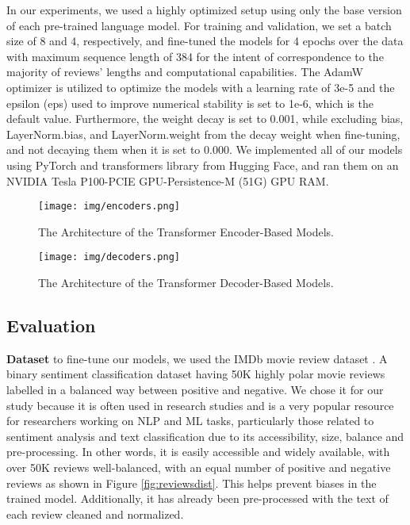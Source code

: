 \documentclass{article}
\begin{document}
In our experiments, we used a highly optimized setup using only the base version of each pre-trained language model. For training and validation, we set a batch size of 8 and 4, respectively, and fine-tuned the models for 4 epochs over the data with maximum sequence length of 384 for the intent of correspondence to the majority of reviews' lengths and computational capabilities. The AdamW optimizer is utilized to optimize the models with a learning rate of 3e-5 and the epsilon (eps) used to improve numerical stability is set to 1e-6, which is the default value. Furthermore, the weight decay is set to 0.001, while excluding bias, LayerNorm.bias, and LayerNorm.weight from the decay weight when fine-tuning, and not decaying them when it is set to 0.000. We implemented all of our models using PyTorch and transformers library from Hugging Face, and ran them on an NVIDIA Tesla P100-PCIE GPU-Persistence-M (51G) GPU RAM.


\begin{figure}[ht]
    \centering
    \texttt{[image: img/encoders.png]}
    \vspace{.5em}
    \caption{The Architecture of the Transformer Encoder-Based Models.}
    \label{fig:encoder}
\end{figure}


\begin{figure}[ht]
    \centering
    \texttt{[image: img/decoders.png]}
    \vspace{.5em}
    \caption{The Architecture of the Transformer Decoder-Based Models.}
    \label{fig:decoder}
\end{figure}




\subsection{Evaluation}
\textbf{Dataset} to fine-tune our models, we used the IMDb movie review dataset \cite{maas-EtAl:2011:ACL-HLT2011}. A binary sentiment classification dataset having 50K highly polar movie reviews labelled in a balanced way between positive and negative. We chose it for our study because it is often used in research studies and is a very popular resource for researchers working on NLP and ML tasks, particularly those related to sentiment analysis and text classification due to its accessibility, size, balance and pre-processing. In other words, it is easily accessible and widely available, with over 50K reviews well-balanced, with an equal number of positive and negative reviews as shown in Figure \ref{fig:reviewsdist}. This helps prevent biases in the trained model. Additionally, it has already been pre-processed with the text of each review cleaned and normalized.
\end{document}
